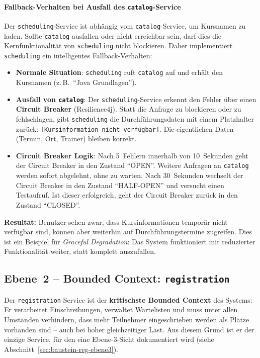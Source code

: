 \paragraph{Fallback-Verhalten bei Ausfall des \texttt{catalog}-Service}

Der \texttt{scheduling}-Service ist abhängig vom
\texttt{catalog}-Service, um Kursnamen zu laden. Sollte
\texttt{catalog} ausfallen oder nicht erreichbar sein, darf dies
die Kernfunktionalität von \texttt{scheduling} nicht blockieren.
Daher implementiert \texttt{scheduling} ein intelligentes
Fallback-Verhalten:

\begin{itemize}[leftmargin=1.5em]
  \item \textbf{Normale Situation}: \texttt{scheduling} ruft
  \texttt{catalog} auf und erhält den Kursnamen
  (z.\,B.\ ``Java Grundlagen'').
  \item \textbf{Ausfall von \texttt{catalog}}: Der
  \texttt{scheduling}-Service erkennt den Fehler über
  einen \textbf{Circuit Breaker} (Resilience4j). Statt
  die Anfrage zu blockieren oder zu fehlschlagen, gibt
  \texttt{scheduling} die Durchführungsdaten mit einem
  Platzhalter zurück: \texttt{[Kursinformation nicht
  verfügbar]}. Die eigentlichen Daten (Termin, Ort,
  Trainer) bleiben korrekt.
  \item \textbf{Circuit Breaker Logik}: Nach 5~Fehlern
  innerhalb von 10~Sekunden geht der Circuit Breaker in
  den Zustand ``OPEN''. Weitere Anfragen an
  \texttt{catalog} werden sofort abgelehnt, ohne zu
  warten. Nach 30~Sekunden wechselt der Circuit Breaker
  in den Zustand ``HALF-OPEN'' und versucht einen
  Testaufruf. Ist dieser erfolgreich, geht der Circuit
  Breaker zurück in den Zustand ``CLOSED''.
\end{itemize}

\textbf{Resultat:} Benutzer sehen zwar, dass Kursinformationen
temporär nicht verfügbar sind, können aber weiterhin auf
Durchführungstermine zugreifen. Dies ist ein Beispiel für
\emph{Graceful Degradation}: Das System funktioniert mit
reduzierter Funktionalität weiter, statt komplett auszufallen.

\subsection{Ebene~2 -- Bounded Context: \texttt{registration}}
\label{sec:baustein-registration}

Der \texttt{registration}-Service ist der \textbf{kritischste
Bounded Context} des Systems: Er verarbeitet Einschreibungen,
verwaltet Wartelisten und muss unter allen Umständen verhindern,
dass mehr Teilnehmer eingeschrieben werden als Plätze vorhanden
sind -- auch bei hoher gleichzeitiger Last. Aus diesem Grund
ist er der einzige Service, für den eine Ebene-3-Sicht
dokumentiert wird
(siehe Abschnitt~\ref{sec:baustein-reg-ebene3}).

